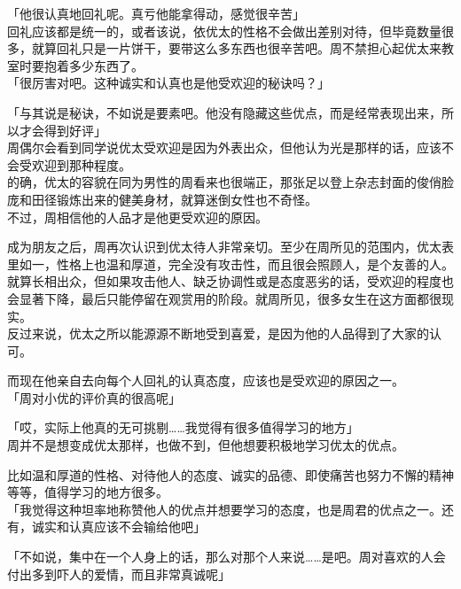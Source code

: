 「他很认真地回礼呢。真亏他能拿得动，感觉很辛苦」\\

回礼应该都是统一的，或者该说，依优太的性格不会做出差别对待，但毕竟数量很多，就算回礼只是一片饼干，要带这么多东西也很辛苦吧。周不禁担心起优太来教室时要抱着多少东西了。\\

「很厉害对吧。这种诚实和认真也是他受欢迎的秘诀吗？」

「与其说是秘诀，不如说是要素吧。他没有隐藏这些优点，而是经常表现出来，所以才会得到好评」\\

周偶尔会看到同学说优太受欢迎是因为外表出众，但他认为光是那样的话，应该不会受欢迎到那种程度。\\

的确，优太的容貌在同为男性的周看来也很端正，那张足以登上杂志封面的俊俏脸庞和田径锻炼出来的健美身材，就算迷倒女性也不奇怪。\\

不过，周相信他的人品才是他更受欢迎的原因。

成为朋友之后，周再次认识到优太待人非常亲切。至少在周所见的范围内，优太表里如一，性格上也温和厚道，完全没有攻击性，而且很会照顾人，是个友善的人。\\

就算长相出众，但如果攻击他人、缺乏协调性或是态度恶劣的话，受欢迎的程度也会显著下降，最后只能停留在观赏用的阶段。就周所见，很多女生在这方面都很现实。\\

反过来说，优太之所以能源源不断地受到喜爱，是因为他的人品得到了大家的认可。

而现在他亲自去向每个人回礼的认真态度，应该也是受欢迎的原因之一。\\

「周对小优的评价真的很高呢」

「哎，实际上他真的无可挑剔……我觉得有很多值得学习的地方」\\

周并不是想变成优太那样，也做不到，但他想要积极地学习优太的优点。

比如温和厚道的性格、对待他人的态度、诚实的品德、即使痛苦也努力不懈的精神等等，值得学习的地方很多。\\

「我觉得这种坦率地称赞他人的优点并想要学习的态度，也是周君的优点之一。还有，诚实和认真应该不会输给他吧」

「不如说，集中在一个人身上的话，那么对那个人来说……是吧。周对喜欢的人会付出多到吓人的爱情，而且非常真诚呢」


